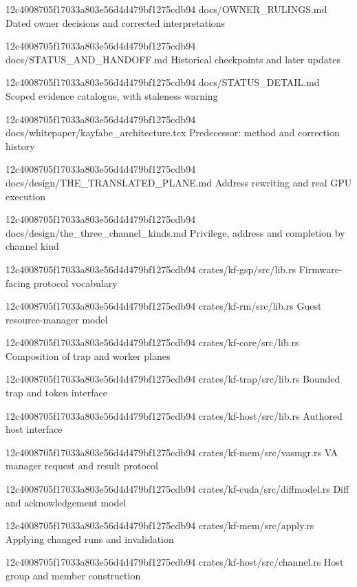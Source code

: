 \begin{description}[style=nextline]
{12c4008705f17033a803e56d4d479bf1275cdb94}
{docs/OWNER_RULINGS.md}
{Dated owner decisions and corrected interpretations}

{12c4008705f17033a803e56d4d479bf1275cdb94}
{docs/STATUS_AND_HANDOFF.md}
{Historical checkpoints and later updates}

{12c4008705f17033a803e56d4d479bf1275cdb94}
{docs/STATUS_DETAIL.md}
{Scoped evidence catalogue, with staleness warning}

{12c4008705f17033a803e56d4d479bf1275cdb94}
{docs/whitepaper/kayfabe_architecture.tex}
{Predecessor: method and correction history}

{12c4008705f17033a803e56d4d479bf1275cdb94}
{docs/design/THE_TRANSLATED_PLANE.md}
{Address rewriting and real GPU execution}

{12c4008705f17033a803e56d4d479bf1275cdb94}
{docs/design/the_three_channel_kinds.md}
{Privilege, address and completion by channel kind}

{12c4008705f17033a803e56d4d479bf1275cdb94}
{crates/kf-gsp/src/lib.rs}
{Firmware-facing protocol vocabulary}

{12c4008705f17033a803e56d4d479bf1275cdb94}
{crates/kf-rm/src/lib.rs}
{Guest resource-manager model}

{12c4008705f17033a803e56d4d479bf1275cdb94}
{crates/kf-core/src/lib.rs}
{Composition of trap and worker planes}

{12c4008705f17033a803e56d4d479bf1275cdb94}
{crates/kf-trap/src/lib.rs}
{Bounded trap and token interface}

{12c4008705f17033a803e56d4d479bf1275cdb94}
{crates/kf-host/src/lib.rs}
{Authored host interface}

{12c4008705f17033a803e56d4d479bf1275cdb94}
{crates/kf-mem/src/vasmgr.rs}
{VA manager request and result protocol}

{12c4008705f17033a803e56d4d479bf1275cdb94}
{crates/kf-cuda/src/diffmodel.rs}
{Diff and acknowledgement model}

{12c4008705f17033a803e56d4d479bf1275cdb94}
{crates/kf-mem/src/apply.rs}
{Applying changed runs and invalidation}

{12c4008705f17033a803e56d4d479bf1275cdb94}
{crates/kf-host/src/channel.rs}
{Host group and member construction}


\end{description}
